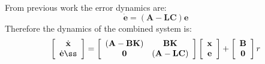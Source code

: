 From previous work the error dynamics are:
\[
\dot{\mathbf{e}} = (\mathbf{A}-\mathbf{LC})\mathbf{e}
\]
Therefore the dynamics of the combined system is:
\[\left[ {\begin{array}{*{20}c}
   {\dot{\mathbf{x}}}  \\
   {\dot{\mathbf{e}}ß}  \\
\end{array}} \right] = \left[ {\begin{array}{*{20}c}
   {\left( {{\bf{A}} - {\bf{BK}}} \right)} & {{\bf{BK}}}  \\
   {\bf{0}} & {\left( {{\bf{A}} - {\bf{LC}}} \right)}  \\
\end{array}} \right]\left[ {\begin{array}{*{20}c}
   {\bf{x}}  \\
   {\bf{e}}  \\
\end{array}} \right] + \left[ {\begin{array}{*{20}c}
   {\bf{B}}  \\
   {\bf{0}}  \\
\end{array}} \right]r
\]
\endinput

